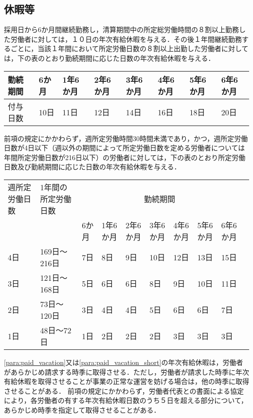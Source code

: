 \documentclass[11pt,a4paper]{jsarticle}
\begin{document}
\subsection{休暇等}
採用日から6か月間継続勤務し，清算期間中の所定総労働時間の８割以上勤務した労働者に対しては，１０日の年次有給休暇を与える．その後１年間継続勤務するごとに，当該１年間において所定労働日数の８割以上出勤した労働者に対しては，下の表のとおり勤続期間に応じた日数の年次有給休暇を与える．	\begin{tabular}{|l|p{2.5em}|p{2.5em}|p{2.5em}|p{2.5em}|p{2.5em}|p{2.5em}|p{2.5em}|} \hline
	勤続期間 & 6か月 & 1年6か月& 2年6か月& 3年6か月& 4年6か月& 5年6か月& 6年6か月 \\ \hline \hline
	付与日数 & 10日 & 11日& 12日& 14日& 16日& 18日& 20日 \\ \hline
\end{tabular}
\label{para:paid_vacation}
\term
前項の規定にかかわらず，週所定労働時間30時間未満であり，かつ，週所定労働日数が4日以下（週以外の期間によって所定労働日数を定める労働者については年間所定労働日数が216日以下）の労働者に対しては，下の表のとおり所定労働日数及び勤続期間に応じた日数の年次有給休暇を与える．
\begin{tabular}{|p{3em}|p{4em}|p{2.5em}|p{2.5em}|p{2.5em}|p{2.5em}|p{2.5em}|p{2.5em}|p{2.5em}|p{2.5em}|} \hline
	週所定労働日数 & 1年間の所定労働日数 & \multicolumn{7}{|c|}{勤続期間} \\ \cline{3-9}
	& & 6か月 & 1年6か月& 2年6か月& 3年6か月& 4年6か月& 5年6か月& 6年6か月 \\ \hline \hline
	4日 & 169日～216日 & 7日 & 8日& 9日& 10日& 12日& 13日& 15日 \\ \hline
	3日 & 121日～168日 & 5日 & 6日& 6日&  8日&  9日& 10日& 11日 \\ \hline
	2日 & 73日～120日  & 3日 & 4日& 4日&  5日&  6日&  6日&  7日 \\ \hline
	1日 & 48日～72日   & 1日 & 2日& 2日&  2日&  3日&  3日&  3日 \\ \hline
\end{tabular}
\label{para:paid_vacation_short}
\term
\ref{para:paid_vacation}又は\ref{para:paid_vacation_short}の年次有給休暇は，労働者があらかじめ請求する時季に取得させる．ただし，労働者が請求した時季に年次有給休暇を取得させることが事業の正常な運営を妨げる場合は，他の時季に取得させることがある．
\term
前項の規定にかかわらず，労働者代表との書面による協定により，各労働者の有する年次有給休暇日数のうち５日を超える部分について，あらかじめ時季を指定して取得させることがある．
\end{document}
